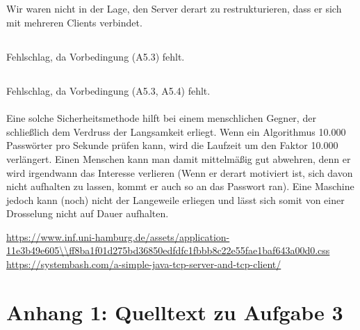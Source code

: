 \documentclass[twoside]{article}
\begin{document}
\subsection{}
Wir waren nicht in der Lage, den Server derart zu restrukturieren, dass er sich mit mehreren Clients verbindet.
\subsection{}
Fehlschlag, da Vorbedingung (A5.3) fehlt.
\subsection{}
Fehlschlag, da Vorbedingung (A5.3, A5.4) fehlt.\\
\\
Eine solche Sicherheitsmethode hilft bei einem menschlichen Gegner, der schließlich dem Verdruss der Langsamkeit erliegt.
Wenn ein Algorithmus 10.000 Passwörter pro Sekunde prüfen kann, wird die Laufzeit um den Faktor 10.000 verlängert.
Einen Menschen kann man damit mittelmäßig gut abwehren, denn er wird irgendwann das Interesse verlieren (Wenn er derart motiviert ist, sich davon nicht aufhalten zu lassen, kommt er auch so an das Passwort ran).
Eine Maschine jedoch kann (noch) nicht der Langeweile erliegen und lässt sich somit von einer Drosselung nicht auf Dauer aufhalten.
\begin{thebibliography}{1}
	\url{https://www.inf.uni-hamburg.de/assets/application-11e3b49e605\\ff8ba1f01d275bd36850edfdfc1fbbb8c22e55fae1baf643a00d0.css}
	\url{https://systembash.com/a-simple-java-tcp-server-and-tcp-client/}
\end{thebibliography}
\newpage
\section*{Anhang 1: Quelltext zu Aufgabe 3}
\end{document}
